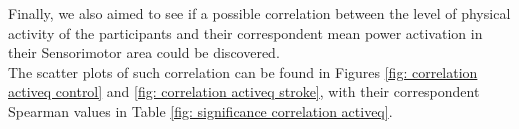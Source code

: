 Finally, we also aimed to see if a possible correlation between the level of physical activity of the participants and their correspondent mean power activation in their Sensorimotor area could be discovered. \\
The scatter plots of such correlation can be found in Figures \ref{fig: correlation activeq control} and \ref{fig: correlation activeq stroke}, with their correspondent Spearman values in Table \ref{fig: significance correlation activeq}.